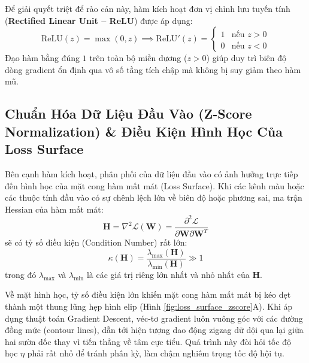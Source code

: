 \documentclass[12pt,a4paper]{report}
\begin{document}
Để giải quyết triệt để rào cản này, hàm kích hoạt đơn vị chỉnh lưu tuyến tính (\textbf{Rectified Linear Unit -- ReLU}) được áp dụng:
\begin{equation}
    \text{ReLU}(z) = \max(0, z) \implies \text{ReLU}'(z) = 
    \begin{cases} 
      1 & \text{nếu } z > 0 \\ 
      0 & \text{nếu } z < 0 
    \end{cases}
\end{equation}
Đạo hàm bằng đúng $1$ trên toàn bộ miền dương ($z > 0$) giúp duy trì biên độ dòng gradient ổn định qua vô số tầng tích chập mà không bị suy giảm theo hàm mũ.

\subsection{Chuẩn Hóa Dữ Liệu Đầu Vào (Z-Score Normalization) \& Điều Kiện Hình Học Của Loss Surface}
Bên cạnh hàm kích hoạt, phân phối của dữ liệu đầu vào có ảnh hưởng trực tiếp đến hình học của mặt cong hàm mất mát (Loss Surface). Khi các kênh màu hoặc các thuộc tính đầu vào có sự chênh lệch lớn về biên độ hoặc phương sai, ma trận Hessian của hàm mất mát:
\begin{equation}
    \mathbf{H} = \nabla^2 \mathcal{L}(\mathbf{W}) = \frac{\partial^2 \mathcal{L}}{\partial \mathbf{W} \partial \mathbf{W}^T}
\end{equation}
sẽ có tỷ số điều kiện (Condition Number) rất lớn:
\begin{equation}
    \kappa(\mathbf{H}) = \frac{\lambda_{\max}(\mathbf{H})}{\lambda_{\min}(\mathbf{H})} \gg 1
\end{equation}
trong đó $\lambda_{\max}$ và $\lambda_{\min}$ là các giá trị riêng lớn nhất và nhỏ nhất của $\mathbf{H}$.

Về mặt hình học, tỷ số điều kiện lớn khiến mặt cong hàm mất mát bị kéo dẹt thành một thung lũng hẹp hình elip (Hình \ref{fig:loss_surface_zscore}A). Khi áp dụng thuật toán Gradient Descent, véc-tơ gradient luôn vuông góc với các đường đồng mức (contour lines), dẫn tới hiện tượng dao động zigzag dữ dội qua lại giữa hai sườn dốc thay vì tiến thẳng về tâm cực tiểu. Quá trình này đòi hỏi tốc độ học $\eta$ phải rất nhỏ để tránh phân kỳ, làm chậm nghiêm trọng tốc độ hội tụ.
\end{document}
